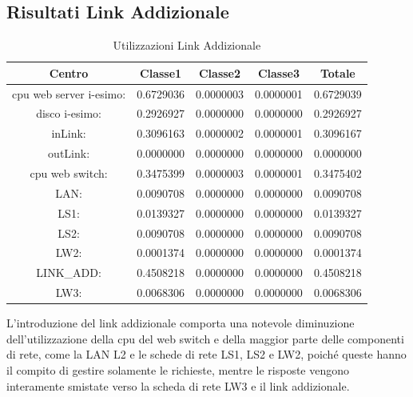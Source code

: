 \subsection{Risultati Link Addizionale}
\begin{table}[htbp]
\begin{center}
\begin{tabular}{||c|c|c|c|c||}
\hline
Centro &Classe1 &Classe2 &Classe3 &Totale\\
\hline
\hline
 cpu web server i-esimo: 	&0.6729036	&0.0000003	&0.0000001	&0.6729039\\
\hline
 disco i-esimo: 	&0.2926927	&0.0000000	&0.0000000	&0.2926927\\
\hline
 inLink: 	&0.3096163	&0.0000002	&0.0000001	&0.3096167\\
\hline
 outLink: 	&0.0000000	&0.0000000	&0.0000000	&0.0000000\\
\hline
 cpu web switch: 	&0.3475399	&0.0000003	&0.0000001	&0.3475402\\
\hline
 LAN: 	&0.0090708	&0.0000000	&0.0000000	&0.0090708\\
\hline
 LS1: 	&0.0139327	&0.0000000	&0.0000000	&0.0139327\\
\hline
 LS2:	&0.0090708	&0.0000000	&0.0000000	&0.0090708\\
\hline
 LW2: 	&0.0001374	&0.0000000	&0.0000000	&0.0001374\\
\hline
 LINK\_ADD: 	&0.4508218	&0.0000000	&0.0000000	&0.4508218\\
\hline
 LW3: 	&0.0068306	&0.0000000	&0.0000000	&0.0068306\\
\hline
\end{tabular}
\end{center}
\caption{Utilizzazioni Link Addizionale}
\label{utilizzazioni}
\end{table}
L'introduzione del link addizionale comporta una notevole diminuzione dell'utilizzazione della cpu del web switch e  della maggior parte delle componenti di rete, come la LAN L2 e le schede di rete LS1, LS2 e LW2, poiché queste hanno il compito di gestire solamente le richieste, mentre le risposte  vengono interamente smistate verso la scheda di rete LW3 e il link addizionale.
